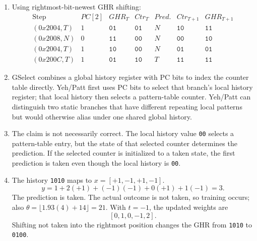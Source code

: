 \documentclass[11pt]{article}
\begin{document}
\begin{enumerate}
    \item Using rightmost-bit-newest GHR shifting:
    \[
    \begin{array}{c|c|c|c|c|c|c}
        \text{Step} & PC[2] & GHR_T & Ctr_T & Pred. & Ctr_{T+1} & GHR_{T+1}\\
        \hline
        (0x2004,T) & 1 & \texttt{01} & \texttt{01} & N & \texttt{10} & \texttt{11}\\
        (0x2008,N) & 0 & \texttt{11} & \texttt{00} & N & \texttt{00} & \texttt{10}\\
        (0x2004,T) & 1 & \texttt{10} & \texttt{00} & N & \texttt{01} & \texttt{01}\\
        (0x200C,T) & 1 & \texttt{01} & \texttt{10} & T & \texttt{11} & \texttt{11}
    \end{array}
    \]

    \item GSelect combines a global history register with PC bits to index the counter table directly.
    Yeh/Patt first uses PC bits to select that branch's local history register; that local history then selects a pattern-table counter.
    Yeh/Patt can distinguish two static branches that have different repeating local patterns but would otherwise alias under one shared global history.

    \item The claim is not necessarily correct.
    The local history value \texttt{00} selects a pattern-table entry, but the state of that selected counter determines the prediction.
    If the selected counter is initialized to a taken state, the first prediction is taken even though the local history is \texttt{00}.

    \item The history \texttt{1010} maps to \(x=[+1,-1,+1,-1]\).
    \[
        y=1+2(+1)+(-1)(-1)+0(+1)+1(-1)=3.
    \]
    The prediction is taken.
    The actual outcome is not taken, so training occurs; also \(\theta=\lfloor1.93(4)+14\rfloor=21\).
    With \(t=-1\), the updated weights are
    \[
        [0,1,0,-1,2].
    \]
    Shifting not taken into the rightmost position changes the GHR from \texttt{1010} to \texttt{0100}.
\end{enumerate}
\end{document}
